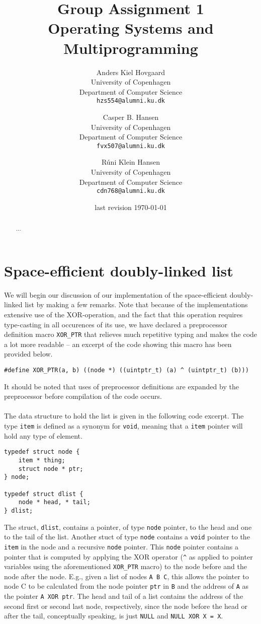 \documentclass[11pt]{article}
\title
{
    {\Large Group Assignment 1} \\
    Operating Systems and Multiprogramming
}
\author
{
    Anders Kiel Hovgaard \\
    University of Copenhagen \\
    Department of Computer Science \\
    {\tt hzs554@alumni.ku.dk}
    \and
    Casper B. Hansen \\
    University of Copenhagen \\
    Department of Computer Science \\
    {\tt fvx507@alumni.ku.dk}
    \and
    Rúni Klein Hansen \\
    University of Copenhagen \\
    Department of Computer Science \\
    {\tt cdn768@alumni.ku.dk}
}
\date{last revision \today}
\newcommand{\code}[1]{{\tt #1}}
\begin{document}
\clearpage
\maketitle
\thispagestyle{empty}
\begin{multicols}{2}
    \begin{abstract}
    ...
    \end{abstract}
    \vfill\columnbreak
    \tableofcontents\vfill
\end{multicols}
\newpage

\section{Space-efficient doubly-linked list}
We will begin our discussion of our implementation of the space-efficient
doubly-linked list by making a few remarks. Note that because of the
implementations extensive use of the XOR-operation, and the fact that this
operation requires type-casting in all occurences of its use, we have declared
a preprocessor definition macro \code{XOR\_PTR} that relieves much repetitive
typing and makes the code a lot more readable -- an excerpt of the code
showing this macro has been provided below.

\begin{lstlisting}
#define XOR_PTR(a, b) ((node *) ((uintptr_t) (a) ^ (uintptr_t) (b)))
\end{lstlisting}

It should be noted that uses of preprocessor definitions are expanded by the
preprocessor before compilation of the code occurs.\\
\\
The data structure to hold the list is given in the following code excerpt. The
type \code{item} is defined as a synonym for \code{void}, meaning that a
\code{item} pointer will hold any type of element.
\begin{lstlisting}
typedef struct node {
    item * thing;
    struct node * ptr;
} node;

typedef struct dlist {
    node * head, * tail;
} dlist;
\end{lstlisting}
The struct, \code{dlist}, contains a pointer, of type \code{node} pointer, to the
head and one to the tail of the list. Another stuct of type \code{node} contains
a \code{void} pointer to the \code{item} in the node and a recursive \code{node}
pointer. This \code{node} pointer contains a pointer that is computed by
applying the XOR operator (\lstinline{^} as applied to pointer variables using
the aforementioned \lstinline{XOR_PTR} macro) to the node before and the node
after the node. E.g., given a list of nodes \verb|A B C|, this allows the pointer to
node C to be calculated from the node pointer \code{ptr} in \verb|B| and the
address of \verb|A| as the pointer \code{A XOR ptr}. The head and tail of a list
contains the address of the second first or second last node, respectively,
since the node before the head or after the tail, conceptually speaking, is just
\code{NULL} and \code{NULL XOR X = X}.
\end{document}
